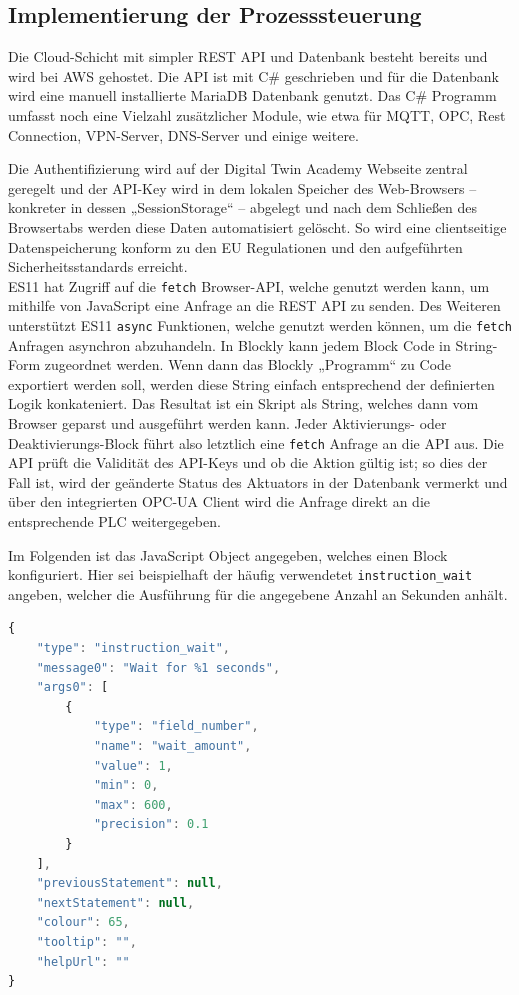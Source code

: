 \subsection{Implementierung der Prozesssteuerung}
\label{subsec:prozesssteuerung_implementierung}

Die Cloud-Schicht mit simpler REST API und Datenbank besteht bereits und wird bei AWS gehostet. Die API ist mit C\# geschrieben und für die Datenbank wird eine manuell installierte MariaDB Datenbank genutzt. Das C\# Programm umfasst noch eine Vielzahl zusätzlicher Module, wie etwa für MQTT, OPC, Rest Connection, VPN-Server, DNS-Server und einige weitere.

Die Authentifizierung wird auf der Digital Twin Academy Webseite zentral geregelt und der API-Key wird in dem lokalen Speicher des Web-Browsers – konkreter in dessen „SessionStorage“ – abgelegt und nach dem Schließen des Browsertabs werden diese Daten automatisiert gelöscht. So wird eine clientseitige Datenspeicherung konform zu den EU Regulationen und den aufgeführten Sicherheitsstandards erreicht.\\
ES11 hat Zugriff auf die \verb|fetch| Browser-API, welche genutzt werden kann, um mithilfe von JavaScript eine Anfrage an die REST API zu senden. Des Weiteren unterstützt ES11 \verb|async| Funktionen, welche genutzt werden können, um die \verb|fetch| Anfragen asynchron abzuhandeln. In Blockly kann jedem Block Code in String-Form zugeordnet werden. Wenn dann das Blockly „Programm“ zu Code exportiert werden soll, werden diese String einfach entsprechend der definierten Logik konkateniert. Das Resultat ist ein Skript als String, welches dann vom Browser geparst und ausgeführt werden kann. Jeder Aktivierungs- oder Deaktivierungs-Block führt also letztlich eine \verb|fetch| Anfrage an die API aus. Die API prüft die Validität des API-Keys und ob die Aktion gültig ist; so dies der Fall ist, wird der geänderte Status des Aktuators in der Datenbank vermerkt und über den integrierten OPC-UA Client wird die Anfrage direkt an die entsprechende PLC weitergegeben.

Im Folgenden ist das JavaScript Object angegeben, welches einen Block konfiguriert. Hier sei beispielhaft der häufig verwendetet \verb|instruction_wait| angeben, welcher die Ausführung für die angegebene Anzahl an Sekunden anhält.

\begin{lstlisting}[language=JavaScript]
{
	"type": "instruction_wait",
	"message0": "Wait for %1 seconds",
	"args0": [
		{
			"type": "field_number",
			"name": "wait_amount",
			"value": 1,
			"min": 0,
			"max": 600,
			"precision": 0.1
		}
	],
	"previousStatement": null,
	"nextStatement": null,
	"colour": 65,
	"tooltip": "",
	"helpUrl": ""
}
\end{lstlisting}

